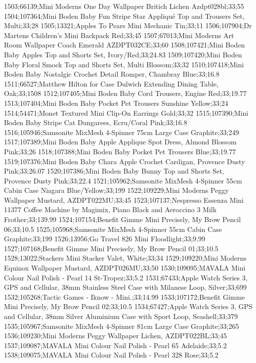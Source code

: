 1503;66139;Mini Moderns One Day Wallpaper Britich Lichen Azdpt028bl;33;55
1504;107364;Mini Boden Baby Fun Stripe Star Appliqué Top and Trousers Set, Multi;33;28
1505;13321;Apples To Pears Mini Mechanic Tin;33;11
1506;107904;Dr Martens Children's Mini Backpack Red;33;45
1507;67013;Mini Moderns Art Room Wallpaper Coach Emerald AZDPT032CE;33;60
1508;107421;Mini Boden Baby Apples Top and Shorts Set, Ivory/Red;33;24.83
1509;107420;Mini Boden Baby Floral Smock Top and Shorts Set, Multi Blossom;33;32
1510;107418;Mini Boden Baby Nostalgic Crochet Detail Romper, Chambray Blue;33;16.8
1511;66527;Matthew Hilton for Case Dulwich Extending Dining Table, Oak;33;1508
1512;107405;Mini Boden Baby Cord Trousers, Engine Red;33;19.77
1513;107404;Mini Boden Baby Pocket Pet Trousers Sunshine Yellow;33;24
1514;54471;Monet Textured Mini Clip-On Earrings Gold;33;32
1515;107390;Mini Boden Baby Stripe Cat Dungarees, Ecru/Coral Pink;33;16.8
1516;105946;Samsonite MixMesh 4-Spinner 75cm Large Case Graphite;33;249
1517;107389;Mini Boden Baby Apple Applique Spot Dress, Almond Blossom Pink;33;26
1518;107388;Mini Boden Baby Pocket Pet Trousers Blue;33;19.77
1519;107376;Mini Boden Baby Chara Apple Crochet Cardigan, Provence Dusty Pink;33;26.07
1520;107386;Mini Boden Baby Bunny Top and Shorts Set, Provence Dusty Pink;33;22.4
1521;105962;Samsonite MixMesh 4-Spinner 55cm Cabin Case Niagara Blue/Yellow;33;199
1522;109229;Mini Moderns Peggy Wallpaper Mustard, AZDPT022MU;33;45
1523;107137;Nespresso Essenza Mini 11377 Coffee Machine by Magimix, Piano Black and Aeroccino 3 Milk Frother;33;139.99
1524;107154;Benefit Gimme Mini Precisely, My Brow Pencil 06;33;10.5
1525;105968;Samsonite MixMesh 4-Spinner 55cm Cabin Case Graphite;33;199
1526;13956;Go Travel 826 Mini Floodlight;33;9.99
1527;107168;Benefit Gimme Mini Precisely, My Brow Pencil 01;33;10.5
1528;13022;Stackers Mini Stacker Valet, White;33;34
1529;109220;Mini Moderns Equinox Wallpaper Mustard, AZDPT026MU;33;50
1530;109095;MAVALA Mini Colour Nail Polish - Pearl 14 St-Tropez;33;5.2
1531;67433;Apple Watch Series 3, GPS and Cellular, 38mm Stainless Steel Case with Milanese Loop, Silver;33;699
1532;105268;Tactic Games - Iknow - Mini.;33;14.99
1533;107172;Benefit Gimme Mini Precisely, My Brow Pencil 02;33;10.5
1534;67427;Apple Watch Series 3, GPS and Cellular, 38mm Silver Aluminium Case with Sport Loop, Seashell;33;379
1535;105967;Samsonite MixMesh 4-Spinner 81cm Large Case Graphite;33;265
1536;109230;Mini Moderns Peggy Wallpaper Lichen, AZDPT022BL;33;45
1537;109087;MAVALA Mini Colour Nail Polish - Pearl 65 Adelaide;33;5.2
1538;109075;MAVALA Mini Colour Nail Polish - Pearl 328 Rose;33;5.2
